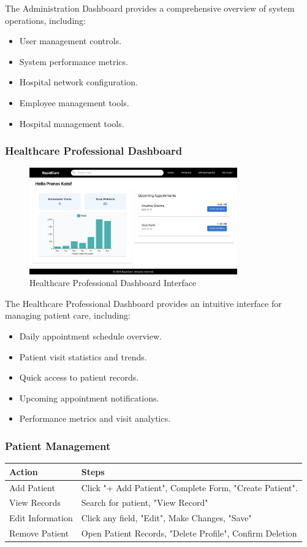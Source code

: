 \documentclass[12pt, titlepage]{article}
\begin{document}
The Administration Dashboard provides a comprehensive overview of system operations, including:
\begin{itemize}
\item User management controls.
\item System performance metrics.
\item Hospital network configuration.
\item Employee management tools.
\item Hospital management tools.
\end{itemize}

\subsubsection{Healthcare Professional Dashboard}
\begin{figure}[H]
\centering
\includegraphics[width=0.8\textwidth]{healthcare.png}
\caption{Healthcare Professional Dashboard Interface}
\label{fig:healthcare_dashboard}
\end{figure}

The Healthcare Professional Dashboard provides an intuitive interface for managing patient care, including:
\begin{itemize}
\item Daily appointment schedule overview.
\item Patient visit statistics and trends.
\item Quick access to patient records.
\item Upcoming appointment notifications.
\item Performance metrics and visit analytics.
\end{itemize}

\subsubsection{Patient Management}
\begin{longtable}{p{}p{}}
\toprule
\textbf{Action} & \textbf{Steps} \\
\midrule
Add Patient & Click "+ Add Patient", Complete Form, "Create Patient". \\
View Records & Search for patient, "View Record" \\
Edit Information & Click any field, "Edit", Make Changes, "Save" \\
Remove Patient & Open Patient Records, "Delete Profile", Confirm Deletion \\
\bottomrule
\end{longtable}
\end{document}
